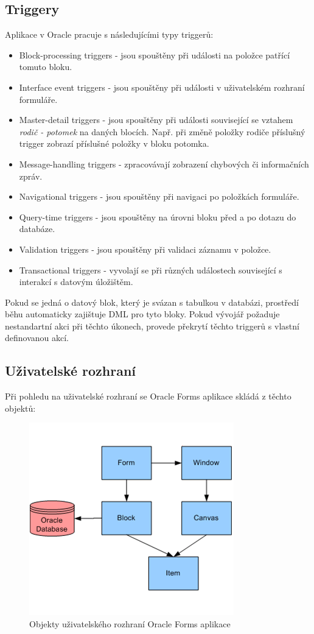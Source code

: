 \documentclass{diplomka}
\begin{document}
\subsection*{Triggery}
Aplikace v Oracle pracuje s následujícími typy triggerů:
\begin{itemize}
\item Block-processing triggers - jsou spouštěny při události na položce patřící tomuto bloku.
\item Interface event triggers - jsou spouštěny při události v uživatelském rozhraní formuláře.
\item Master-detail triggers - jsou spouštěny při události související se vztahem \emph{rodič - potomek} na daných blocích. Např. při změně položky rodiče příslušný trigger zobrazí příslušné položky v bloku potomka.
\item Message-handling triggers - zpracovávají zobrazení chybových či informačních zpráv.
\item Navigational triggers - jsou spouštěny při navigaci po položkách formuláře.
\item Query-time triggers - jsou spouštěny na úrovni bloku před a po dotazu do databáze.
\item Validation triggers - jsou spouštěny při validaci záznamu v položce.
\item Transactional triggers - vyvolají se při různých událostech související s interakcí s datovým úložištěm.
\end{itemize}
Pokud se jedná o datový blok, který je svázan s tabulkou v databázi, prostředí běhu automaticky zajištuje DML pro tyto bloky.
Pokud vývojář požaduje nestandartní akci při těchto úkonech, provede překrytí těchto triggerů s vlastní definovanou akcí.
\newpage
\subsection{Uživatelské rozhraní}
Při pohledu na uživatelské rozhraní se Oracle Forms aplikace skládá z těchto objektů:
\begin{figure}[H]
  \centering
  \includegraphics[scale=0.8]{obr/window.png}
\caption{Objekty uživatelského rozhraní Oracle Forms aplikace\cite{microsoft}}
\label{fig:gui}
\end{figure}
\end{document}
